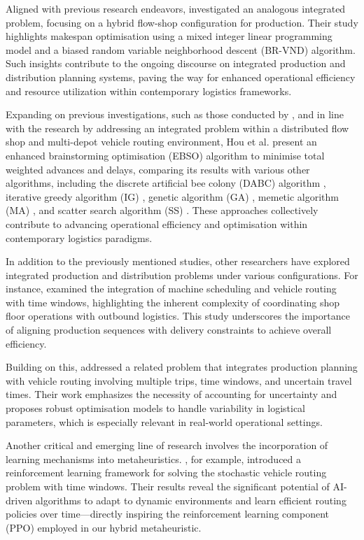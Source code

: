 \documentclass{article}
\begin{document}
Aligned with previous research endeavors, \citep{martins2021combining} investigated an analogous integrated problem, focusing on a hybrid flow-shop configuration for production. Their study highlights makespan optimisation using a mixed integer linear programming model and a biased random variable neighborhood descent (BR-VND) algorithm. Such insights contribute to the ongoing discourse on integrated production and distribution planning systems, paving the way for enhanced operational efficiency and resource utilization within contemporary logistics frameworks.

Expanding on previous investigations, such as those conducted by \citep{martins2021combining}, and in line with the research by \citep{hou2022modelling} addressing an integrated problem within a distributed flow shop and multi-depot vehicle routing environment, Hou et al. present an enhanced brainstorming optimisation (EBSO) algorithm to minimise total weighted advances and delays, comparing its results with various other algorithms, including the discrete artificial bee colony (DABC) algorithm \cite{duan2018effective}, iterative greedy algorithm (IG) \cite{mao2021effective}, genetic algorithm (GA) \cite{zhang2020enhanced}, memetic algorithm (MA) \cite{kurdi2020memetic}, and scatter search algorithm (SS) \cite{pan2019effective}. These approaches collectively contribute to advancing operational efficiency and optimisation within contemporary logistics paradigms.

In addition to the previously mentioned studies, other researchers have explored integrated production and distribution problems under various configurations. For instance, \citep{ullrich2013integrated} examined the integration of machine scheduling and vehicle routing with time windows, highlighting the inherent complexity of coordinating shop floor operations with outbound logistics. This study underscores the importance of aligning production sequences with delivery constraints to achieve overall efficiency.

Building on this, \cite{WangLi2013} addressed a related problem that integrates production planning with vehicle routing involving multiple trips, time windows, and uncertain travel times. Their work emphasizes the necessity of accounting for uncertainty and proposes robust optimisation models to handle variability in logistical parameters, which is especially relevant in real-world operational settings.

Another critical and emerging line of research involves the incorporation of learning mechanisms into metaheuristics. \citep{iklassov2024reinforcementlearningsolvingstochastic}, for example, introduced a reinforcement learning framework for solving the stochastic vehicle routing problem with time windows. Their results reveal the significant potential of AI-driven algorithms to adapt to dynamic environments and learn efficient routing policies over time—directly inspiring the reinforcement learning component (PPO) employed in our hybrid metaheuristic.
\end{document}
